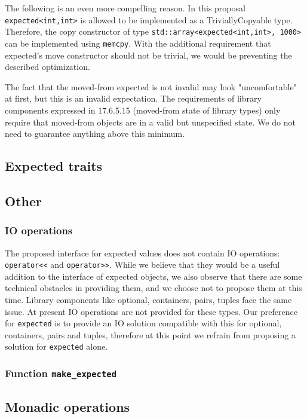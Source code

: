 \documentclass[a4paper,10pt]{article}
\newcommand{\cpp}[1]{\lstinline{#1}}
\begin{document}
The following is an even more compelling reason. In this proposal \cpp{expected<int,int>} is allowed to be implemented as a TriviallyCopyable type. Therefore, the copy constructor of type \cpp{std::array<expected<int,int>, 1000>} can be implemented using \cpp{memcpy}. With the additional requirement that expected's move constructor should not be trivial, we would be preventing the described optimization.

The fact that the moved-from expected is not invalid may look "uncomfortable" at first, but this is an invalid expectation. The requirements of library components expressed in 17.6.5.15 (moved-from state of library types) only require that moved-from objects are in a valid but unspecified state. We do not need to guarantee anything above this minimum.

\subsection{Expected traits}
\label{expected-traits-rational}

\subsection{Other}

\subsubsection{IO operations}

The proposed interface for expected values does not contain IO operations: \cpp{operator<<} and \cpp{operator>>}. While we believe that they would be a useful addition to the interface of expected objects, we also observe that there are some technical obstacles in providing them, and we choose not to propose them at this time. Library components like optional, containers, pairs, tuples face the same issue. At present IO operations are not provided for these types. Our preference for \cpp{expected} is to provide an IO solution compatible with this for optional, containers, pairs and tuples, therefore at this point we refrain from proposing a solution for \cpp{expected} alone.


\subsubsection{Function \cpp{make_expected}}

\subsection{Monadic operations}
\label{monadic-operations}
\end{document}
